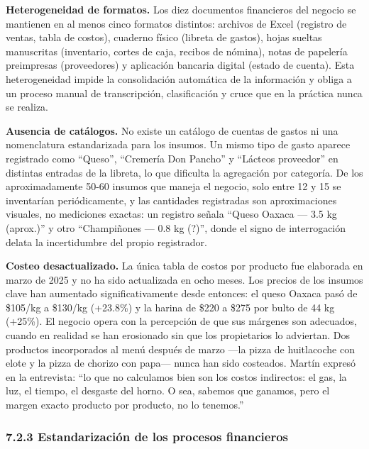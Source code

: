 \documentclass[
  12pt,
  spanish,
]{article}
\begin{document}
\textbf{Heterogeneidad de formatos.} Los diez documentos financieros del
negocio se mantienen en al menos cinco formatos distintos: archivos de
Excel (registro de ventas, tabla de costos), cuaderno físico (libreta de
gastos), hojas sueltas manuscritas (inventario, cortes de caja, recibos
de nómina), notas de papelería preimpresas (proveedores) y aplicación
bancaria digital (estado de cuenta). Esta heterogeneidad impide la
consolidación automática de la información y obliga a un proceso manual
de transcripción, clasificación y cruce que en la práctica nunca se
realiza.

\textbf{Ausencia de catálogos.} No existe un catálogo de cuentas de
gastos ni una nomenclatura estandarizada para los insumos. Un mismo tipo
de gasto aparece registrado como ``Queso'', ``Cremería Don Pancho'' y
``Lácteos proveedor'' en distintas entradas de la libreta, lo que
dificulta la agregación por categoría. De los aproximadamente 50-60
insumos que maneja el negocio, solo entre 12 y 15 se inventarían
periódicamente, y las cantidades registradas son aproximaciones
visuales, no mediciones exactas: un registro señala ``Queso Oaxaca ---
3.5 kg (aprox.)'' y otro ``Champiñones --- 0.8 kg (?)'', donde el signo
de interrogación delata la incertidumbre del propio registrador.

\textbf{Costeo desactualizado.} La única tabla de costos por producto
fue elaborada en marzo de 2025 y no ha sido actualizada en ocho meses.
Los precios de los insumos clave han aumentado significativamente desde
entonces: el queso Oaxaca pasó de \$105/kg a \$130/kg (+23.8\%) y la
harina de \$220 a \$275 por bulto de 44 kg (+25\%). El negocio opera con
la percepción de que sus márgenes son adecuados, cuando en realidad se
han erosionado sin que los propietarios lo adviertan. Dos productos
incorporados al menú después de marzo ---la pizza de huitlacoche con
elote y la pizza de chorizo con papa--- nunca han sido costeados. Martín
expresó en la entrevista: ``lo que no calculamos bien son los costos
indirectos: el gas, la luz, el tiempo, el desgaste del horno. O sea,
sabemos que ganamos, pero el margen exacto producto por producto, no lo
tenemos.''

\hypertarget{estandarizaciuxf3n-de-los-procesos-financieros}{%
\subsubsection{7.2.3 Estandarización de los procesos
financieros}\label{estandarizaciuxf3n-de-los-procesos-financieros}}
\end{document}
